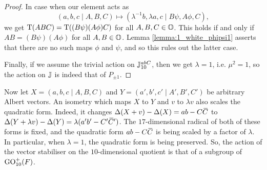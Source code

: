 \begin{proof}
    In case when our element acts as
    \begin{equation*}
   		(a,b,c\mid A,B,C) \mapsto (\lambda^{-1} b, \lambda a, c \mid B\psi, A\phi, C),
   	\end{equation*}
    we get $\operatorname{T}(ABC) = \operatorname{T}((B\psi) (A\phi) C)$
    for all $A,B,C \in \mathbb{O}$. This holds if and only if $AB = (B\psi) (A\phi)$ for
    all $A,B \in \mathbb{O}$. Lemma
    \ref{lemma:1_white_phipsi1} asserts that there are no such maps $\phi$ and $\psi$,
    and so this rules out the latter case.
    
    Finally, if we assume the trivial action on $\mathbb{J}_{10}^{abC}$, then we get $\lambda = 1$,
     i.e. 
    $\mu^2 = 1$, so the action on $\mathbb{J}$ is indeed that of $P_{\pm 1}$. 
\end{proof}

Now let $X = (a,b,c\mid A,B,C)$ and $Y = (a',b',c' \mid A', B', C')$ be arbitrary
Albert vectors. An isometry which maps $X$ to
    $Y$ and $v$ to $\lambda v$ also scales the
    quadratic form. Indeed, it changes 
    \mbox{$\Delta(X+v)-\Delta(X) = ab-C\mathord{\mbox{\hspace*{0pt}}\,\overline{\!C\!\!\;}\!\:}\mbox{\hspace*{0pt}}$} to
    \mbox{$\Delta(Y+\lambda v) - \Delta(Y) = \lambda (a'b' - C'\mathord{\mbox{\hspace*{0pt}}\,\overline{\!C\!\!\;}\!\:}\mbox{\hspace*{0pt}} ')$}. The \mbox{$17$-dimensional}
     radical
    of both of these forms is fixed, and the quadratic form $ab-C\mathord{\mbox{\hspace*{0pt}}\,\overline{\!C\!\!\;}\!\:}\mbox{\hspace*{0pt}}$ is being scaled by
    a factor of $\lambda$. In particular, when $\lambda = 1$, the quadratic
    form is being preserved. So, the action of the vector stabiliser on the $10$-dimensional
    quotient is that of a subgroup of $\mathrm{GO}_{10}^+(F)$. 

